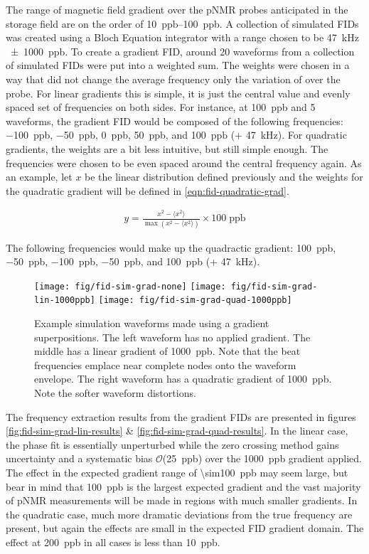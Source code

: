 The range of magnetic field gradient over the pNMR probes anticipated in the \gmtwo storage field are on the order of \SIrange{10}{100}{ppb}. A collection of simulated FIDs was created using a Bloch Equation integrator with a range chosen to be \SI{47}{\kHz} \SI{\pm 1000}{ppb}. To create a gradient FID, around 20 waveforms from a collection of simulated FIDs were put into a weighted sum.  The weights were chosen in a way that did not change the average frequency only the variation of over the probe.  For linear gradients this is simple, it is just the central value and evenly spaced set of frequencies on both sides.  For instance, at \SI{100}{ppb} and 5 waveforms, the gradient FID would be composed of the following frequencies: \SI{-100}{ppb}, \SI{-50}{ppb}, \SI{0}{ppb}, \SI{50}{ppb}, and \SI{100}{ppb} (+ \SI{47}{\kHz}).  For quadratic gradients, the weights are a bit less intuitive, but still simple enough.  The frequencies were chosen to be even spaced around the central frequency again.  As an example, let $x$ be the linear distribution defined previously and the weights for the quadratic gradient will be defined in \ref{eqn:fid-quadratic-grad}.

\begin{align}
\label{eqn:fid-quadratic-grad}
y = \frac{x^2 - \langle x^2 \rangle}{\max{(x^2 - \langle x^2 \rangle)}} \times \mathrm{100\; ppb}
\end{align}

\noindent
The following frequencies would make up the quadractic gradient: \SI{100}{ppb}, \SI{-50}{ppb}, \SI{-100}{ppb}, \SI{-50}{ppb}, and \SI{100}{ppb} (+ \SI{47}{\kHz}).

\begin{figure}
\centering
\texttt{[image: fig/fid-sim-grad-none]}
\texttt{[image: fig/fid-sim-grad-lin-1000ppb]}
\texttt{[image: fig/fid-sim-grad-quad-1000ppb]}
\caption{
    Example simulation waveforms made using a gradient superpositions.  The left waveform has no applied gradient.  The middle has a linear gradient of \SI{1000}{ppb}.  Note that the beat frequencies emplace near complete nodes onto the waveform envelope.  The right waveform has a quadratic gradient of \SI{1000}{ppb}.  Note the softer waveform distortions.
    \label{fig:fid-sim-grad}
}
\end{figure}

The frequency extraction results from the gradient FIDs are presented in figures \ref{fig:fid-sim-grad-lin-results} \& \ref{fig:fid-sim-grad-quad-results}.  In the linear case, the phase fit is essentially unperturbed while the zero crossing method gains uncertainty and a systematic bias $\mathcal{O}$(\SI{25}{ppb}) over the \SI{1000}{ppb} gradient applied.  The effect in the expected gradient range of \SI{\sim100}{ppb} may seem large, but bear in mind that \SI{100}{ppb} is the largest expected gradient and the vast majority of pNMR measurements will be made in regions with much smaller gradients.  In the quadratic case, much more dramatic deviations from the true frequency are present, but again the effects are small in the expected FID gradient domain.  The effect at \SI{200}{ppb} in all cases is less than \SI{10}{ppb}.

